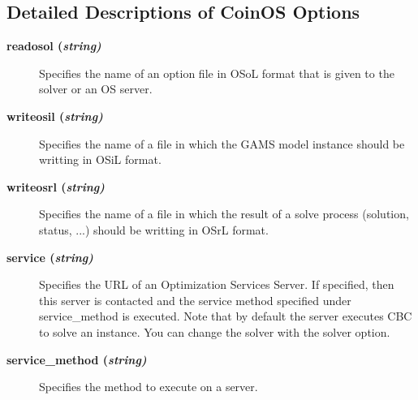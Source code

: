 \subsection{Detailed Descriptions of CoinOS Options}

\begin{description}

\item[\label{readosol}\hypertarget{readosol}
{\textbf{readosol (\slshape{string})}}]\hspace{1.0in}

Specifies the name of an option file in OSoL format that is given to the solver or an OS server.


\item[\label{writeosil}\hypertarget{writeosil}
{\textbf{writeosil (\slshape{string})}}]\hspace{1.0in}

Specifies the name of a file in which the GAMS model instance should be writting in OSiL format.


\item[\label{writeosrl}\hypertarget{writeosrl}
{\textbf{writeosrl (\slshape{string})}}]\hspace{1.0in}

Specifies the name of a file in which the result of a solve process (solution, status, ...) should be writting in OSrL format.


\item[\label{service}\hypertarget{service}
{\textbf{service (\slshape{string})}}]\hspace{1.0in}

Specifies the URL of an Optimization Services Server.
If specified, then this server is contacted and the service method specified under service\_method is executed.
Note that by default the server executes CBC to solve an instance.
You can change the solver with the solver option.


\item[\label{service_method}\hypertarget{service_method}
{\textbf{service\_method (\slshape{string})}}]\hspace{1.0in}

Specifies the method to execute on a server.


\end{description}
